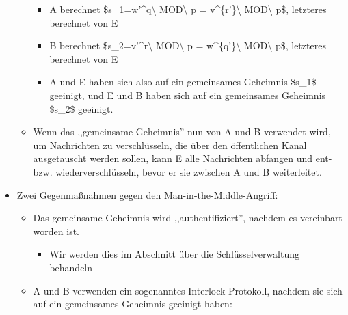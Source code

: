 \documentclass[a4paper]{article}
\begin{document}
\begin{multicols}{3}
\begin{itemize}
\begin{itemize}
                        \begin{itemize}
                            \item
                                  A berechnet \$s\_1=w'\^{}q\textbackslash{} MOD\textbackslash{} p =
                                  v\^{}\{r'\}\textbackslash{} MOD\textbackslash{} p\$, letzteres
                                  berechnet von E
                            \item
                                  B berechnet \$s\_2=v'\^{}r\textbackslash{} MOD\textbackslash{} p =
                                  w\^{}\{q'\}\textbackslash{} MOD\textbackslash{} p\$, letzteres
                                  berechnet von E
                            \item
                                  A und E haben sich also auf ein gemeinsames Geheimnis \$s\_1\$
                                  geeinigt, und E und B haben sich auf ein gemeinsames Geheimnis
                                  \$s\_2\$ geeinigt.
                        \end{itemize}
                  \item
                        Wenn das ,,gemeinsame Geheimnis'' nun von A und B verwendet wird, um
                        Nachrichten zu verschlüsseln, die über den öffentlichen Kanal
                        ausgetauscht werden sollen, kann E alle Nachrichten abfangen und
                        ent- bzw. wiederverschlüsseln, bevor er sie zwischen A und B
                        weiterleitet.
              \end{itemize}
        \item
              Zwei Gegenmaßnahmen gegen den Man-in-the-Middle-Angriff:

              \begin{itemize}
                  \item
                        Das gemeinsame Geheimnis wird ,,authentifiziert'', nachdem es
                        vereinbart worden ist.

                        \begin{itemize}
                            \item
                                  Wir werden dies im Abschnitt über die Schlüsselverwaltung
                                  behandeln
                        \end{itemize}
                  \item
                        A und B verwenden ein sogenanntes Interlock-Protokoll, nachdem sie
                        sich auf ein gemeinsames Geheimnis geeinigt haben:


\end{itemize}
\end{itemize}
\end{multicols}
\end{document}
